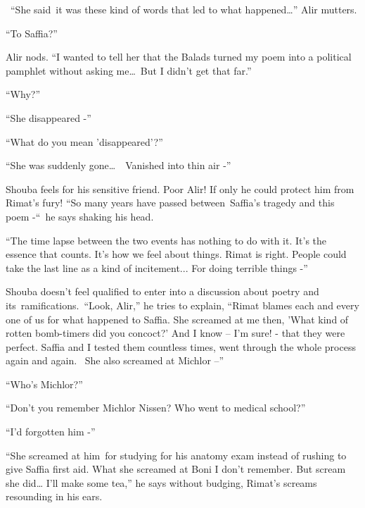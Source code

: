 \documentclass[twoside,11pt]{book}
\begin{document}
~``She said~it was these kind of words that led to what happened{\dots}'' Alir mutters.

``To Saffia?'' 

Alir nods. ``I wanted to tell her that the Balads turned my poem into a political pamphlet without asking
me{\dots}\ But I didn't get that far.'' 

``Why?'' 

``She disappeared -'' 

``What do you mean 'disappeared'?'' 

``She was suddenly gone{\dots}\ \ Vanished into thin air -''

Shouba feels for his sensitive friend. Poor Alir! If only he could protect him from Rimat's fury! ``So many
years have passed between~Saffia's tragedy and this poem -``\ he says shaking his head. 

``The time lapse between the two events has nothing to do with it. It's the essence that counts. It's how
we feel about things. Rimat is right. People could take the last line as a kind of incitement... For doing terrible
things -'' 

Shouba doesn't feel qualified to enter into a discussion about poetry and its{\ }ramifications.\  ``Look,
Alir,'' he tries to explain, ``Rimat blames each and every one of us for what happened to
Saffia. She screamed at me then, 'What kind of rotten bomb-timers did you concoct?' And I know -- I'm sure! - that they
were perfect. Saffia and I tested them countless times, went through the whole process again and again. ~She also
screamed at Michlor --'' 

``Who's Michlor?'' 

``Don't you remember Michlor Nissen? Who went to medical school?'' 

``I'd forgotten him -'' 

``She screamed at him~for studying for his anatomy exam instead of rushing to give Saffia first aid. What
she screamed at Boni I don't remember. But scream she did{\dots} I'll make some tea,'' he says without
budging, Rimat's screams resounding in his ears. 
\end{document}
